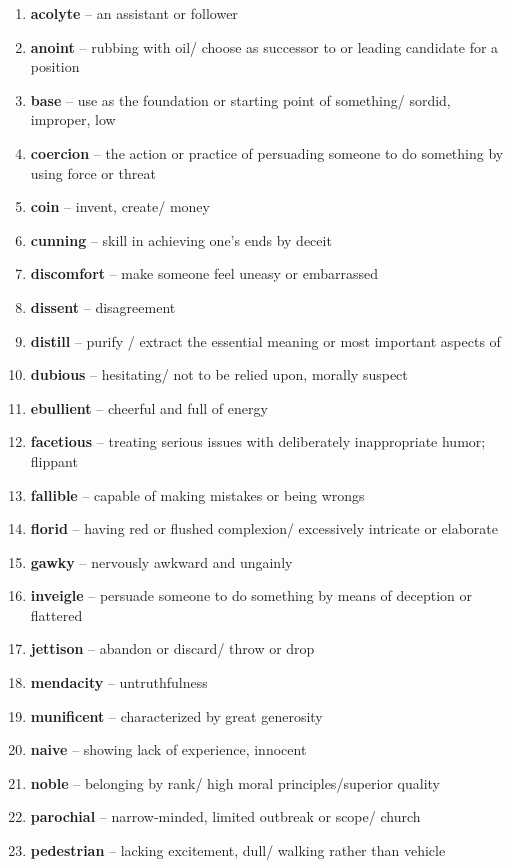 \begin{enumerate}[wide,labelindent=0pt]
\item \textbf{acolyte} -- an assistant or follower
\item \textbf{anoint} -- rubbing with oil/ choose as successor to or leading candidate for a position
\item \textbf{base} -- use as the foundation or starting point of something/ sordid, improper, low
\item \textbf{coercion} -- the action or practice of persuading someone to do something by using force or threat
\item \textbf{coin} -- invent, create/ money
\item \textbf{cunning} -- skill in achieving one's ends by deceit
\item \textbf{discomfort} -- make someone feel uneasy or embarrassed
\item \textbf{dissent} -- disagreement
\item \textbf{distill} -- purify / extract the essential meaning or most important aspects of
\item \textbf{dubious} -- hesitating/ not to be relied upon, morally suspect
\item \textbf{ebullient} -- cheerful and full of energy
\item \textbf{facetious} -- treating serious issues with deliberately inappropriate humor; flippant
\item \textbf{fallible} -- capable of making mistakes or being wrongs
\item \textbf{florid} -- having red or flushed complexion/ excessively intricate or elaborate
\item \textbf{gawky} -- nervously awkward and ungainly
\item \textbf{inveigle} -- persuade someone to do something by means of deception or flattered
\item \textbf{jettison} -- abandon or discard/ throw or drop
\item \textbf{mendacity} -- untruthfulness
\item \textbf{munificent} -- characterized by great generosity
\item \textbf{naive} -- showing lack of experience, innocent
\item \textbf{noble} -- belonging by rank/ high moral principles/superior quality
\item \textbf{parochial} -- narrow-minded, limited outbreak or scope/ church
\item \textbf{pedestrian} -- lacking excitement, dull/ walking rather than vehicle

\end{enumerate}
